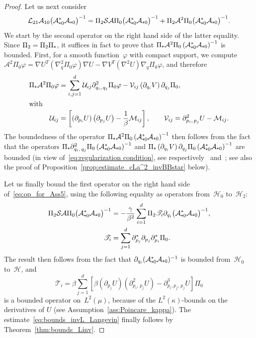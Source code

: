 \documentclass[10pt]{amsart}
\theoremstyle{definition}\newtheorem{defi}[theo]{Definition}\newtheorem{rema}[theo]{Remark}\newtheorem{exam}[theo]{Example}\newtheorem{exem}[theo]{Example}\newtheorem{nota}[theo]{Notation}
\newcommand{\cL}{\mathcal{L}}
\newcommand{\cLs}{\mathcal{S}}
\newcommand{\cLa}{\mathcal{A}}
\newcommand{\cH}{\mathcal{H}}
\newcommand{\cLM}{\mathcal{M}}
\newcommand{\cLU}{\mathcal{U}}
\newcommand{\clV}{\mathcal{V}}
\newcommand{\scrT}{\mathscr{T}}
\newcommand{\subplus}{\textnormal{\texttt{+}}}
\begin{document}
\begin{proof}
Let us next consider
\begin{equation}\label{eq:op_for_Ass5}
\cL_{21}\cLa_{10} \big(\cLa_{\subplus 0}^*\cLa_{\subplus 0}\big)^{-1} = \Pi_2 \cLs \cLa \Pi_0 \big(\cLa_{\subplus 0}^*\cLa_{\subplus 0}\big)^{-1} + \Pi_2 \cLa^2 \Pi_0 \big(\cLa_{\subplus 0}^*\cLa_{\subplus 0}\big)^{-1}.
\end{equation}
We start by the second operator on the right hand side of the latter equality. Since $\Pi_2 = \Pi_2 \Pi_\subplus$, it suffices in fact to prove that $\Pi_\subplus\cLa^2 \Pi_0 \left(\cLa_{\subplus 0}^*\cLa_{\subplus 0}\right)^{-1}$ is bounded. First, for a smooth function~$\varphi$ with compact support, we compute $\cLa^2\Pi_0\varphi = \nabla U^T(\nabla^2_q \Pi_0 \varphi) \nabla U - \nabla V^T (\nabla^2 U) \nabla_q \Pi_0\varphi$, and therefore
\begin{align}
\Pi_\subplus\cLa^2 \Pi_0 \varphi &= \sum_{i,j=1}^d \cLU_{ij} \partial^2_{q_i,\,q_j} \Pi_0 \varphi - \clV_{ij} \left(\partial_{q_i} V\right) \partial_{q_j} \Pi_0,\label{eq:action_cLa2}
\\
\intertext{with}
\cLU_{ij} &= \left[\left(\partial_{p_i} U\right)\left(\partial_{p_j} U\right)-\frac1\beta \cLM_{ij}\right],
\qquad
\clV_{ij} = \partial^2_{p_i,\,p_j}U - \cLM_{ij}.\label{eq:Sij_Tij}
\end{align}
The boundedness of the operator $\Pi_\subplus\cLa^2 \Pi_0
\left(\cLa_{\subplus 0}^*\cLa_{\subplus 0}\right)^{-1}$ then follows from the fact that the operators $\Pi_\subplus\partial^2_{q_i,\,q_j} \Pi_0
\left(\cLa_{\subplus 0}^*\cLa_{\subplus 0}\right)^{-1}$ and $\Pi_\subplus\left(\partial_{q_i} V\right) \partial_{q_j} \Pi_0
\left(\cLa_{\subplus 0}^*\cLa_{\subplus 0}\right)^{-1}$ are bounded (in view of~\eqref{eq:regularization condition}, see respectively~\cite[Proposition~5]{DMS15} and~\cite[Lemma~A.4]{ST18}; see also the proof of Proposition~\ref{prop:estimate_cLa^2_invBBstar} below).

Let us finally bound the first operator on the right hand side of~\eqref{eq:op_for_Ass5}, using the following equality as operators from~$\cH_0$ to~$\cH_2$:
\begin{align*}
\Pi_2 \cLs \cLa \Pi_0 \big(\cLa_{\subplus 0}^*\cLa_{\subplus 0}\big)^{-1} & = -\frac{\gamma}{\beta^2} \sum_{i=1}^d \Pi_2 \scrT_{i} \partial_{q_i} \big(\cLa_{\subplus 0}^*\cLa_{\subplus 0}\big)^{-1},
\\
\scrT_i &= \sum_{j=1}^d \partial_{p_j}^* \partial_{p_j} \partial_{p_i}^* \Pi_0.
\end{align*}
The result then follows from the fact that $\partial_{q_i} (\cLa_{\subplus 0}^*\cLa_{\subplus 0})^{-1}$ is bounded from~$\cH_0$ to~$\cH$, and
\[
\scrT_i = \beta \sum_{j=1}^d \left[\beta \left(\partial_{p_j}U\right)\left(\partial^2_{p_i,\,p_j}U\right) -\partial^3_{p_i, p_j,\,p_j} U\right] \Pi_0
\]
is a bounded operator on~$L^2(\mu)$, because of the $L^2(\kappa)$-bounds on the derivatives of $U$ (see Assumption~\ref{ass:Poincare_kappa}). The estimate~\eqref{eq:bounds_invL_Langevin} finally follows by Theorem~\ref{thm:bounds_Linv}.
\end{proof}
\end{document}
